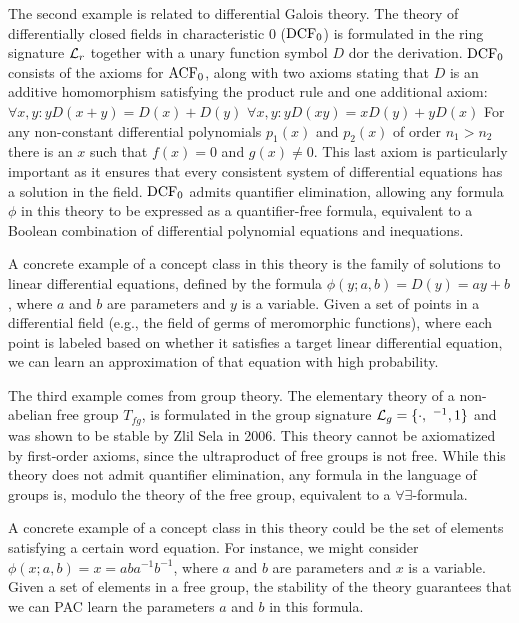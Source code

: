 \begin{example}
\begin{outline}
    \0 The second example is related to differential Galois theory. The theory of differentially closed fields in characteristic $0$ ($\operatorname{DCF}_0$) is formulated in the ring signature $\mathcal{L}_r$ together with a unary function symbol $D$ dor the derivation. $\operatorname{DCF}_0$ consists of the axioms for $\operatorname{ACF}_0$, along with two axioms stating that $D$ is an additive homomorphism satisfying the product rule and one additional axiom: 
        \1 $\forall x,y: y D(x+y)=D(x)+D(y)$
        \1 $\forall x,y: y D(xy)=x D(y)+ yD(x)$
        \1 For any non-constant differential polynomials $p_1(x)$ and $p_2(x)$ of order $n_1 > n_2$ there is an $x$ such that $f(x)=0$ and $g(x)\neq 0$.
    \0 This last axiom is particularly important as it ensures that every consistent system of differential equations has a solution in the field. $\operatorname{DCF}_0$ admits quantifier elimination, allowing any formula $\phi$ in this theory to be expressed as a quantifier-free formula, equivalent to a Boolean combination of differential polynomial equations and inequations.
    
    A concrete example of a concept class in this theory is the family of solutions to linear differential equations, defined by the formula $\phi(y; a, b) = D(y) = ay + b$, where $a$ and $b$ are parameters and $y$ is a variable. Given a set of points in a differential field (e.g., the field of germs of meromorphic functions), where each point is labeled based on whether it satisfies a target linear differential equation, we can learn an approximation of that equation with high probability. 
\end{outline}
\end{example}

\begin{example}
\begin{outline}
    \0 The third example comes from group theory. The elementary theory of a non-abelian free group $T_{fg}$, is formulated in the group signature $\mathcal{L}_g = \{\cdot, ~^{-1}, 1\}$ and was shown to be stable by Zlil Sela in 2006. This theory cannot be axiomatized by first-order axioms, since the ultraproduct of free groups is not free. While this theory does not admit quantifier elimination, any formula in the language of groups is, modulo the theory of the free group, equivalent to a $\forall \exists$-formula. 
    
    A concrete example of a concept class in this theory could be the set of elements satisfying a certain word equation. For instance, we might consider $\phi(x;a,b)=x=aba^{-1}b^{-1}$, where $a$ and $b$ are parameters and $x$ is a variable. Given a set of elements in a free group, the stability of the theory guarantees that we can PAC learn the parameters $a$ and $b$ in this formula.
\end{outline}
\end{example}

